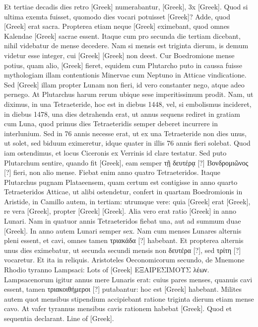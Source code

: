 Et tertiae decadis dies retro \textgreek{[Greek]}
 numerabantur, \textgreek{[Greek]},
\textgreek{3x [Greek]}.
Quod si ultima exemta fuisset,
quomodo  dies vocari potuisset \textgreek{[Greek]}?
Adde, quod
\textgreek{[Greek]} erat sacra.
Propterea etiam neque \textgreek{[Greek]} eximebant,
quod omnes Kalendae \textgreek{[Greek]} sacrae essent.
Itaque cum pro secunda
die tertiam dicebant, nihil videbatur de mense decedere.
Nam si
mensis est triginta dierum, is demum videtur esse integer,
 cui \textgreek{[Greek]}
\textgreek{[Greek]} non deest.
Cur Boedromione mense potius, quam alio,
\textgreek{[Greek]} fieret, equidem cum Plutarcho puto in caussa
 fuisse mythologiam
illam contentionis Minervae cum Neptuno in Atticae vindicatione.
Sed \textgreek{[Greek]} illam propter Lunam non fieri,
 id vero constanter
nego, atque adeo pernego.
At Plutarchus harum rerum ubique sese imperitissimum
prodit.
Nam, ut diximus, in una Tetraeteride, hoc est in
diebus 1448, vel, si embolismus incideret, in diebus 1478, una dies detrahenda
erat, ut annus sequens rediret in gratiam cum Luna, quod
primus dies Tetraeteridis semper deberet incurrere in interlunium.
Sed
in 76 annis necesse erat, ut ex una Tetraeteride non dies unus, ut solet,
sed biduum eximeretur, idque quater in illis 76 annis fieri solebat.
Quod
iam ostendimus, et locus Ciceronis ex Verrinis id clare testatur.
Sed
puto Plutarchum sentire, quando fit \textgreek{[Greek]},
 eam semper \textgreek{τῇ δευτέρᾳ [?]}
\textgreek{Βονδρομιῶνος [?]} fieri, non alio mense.
Fiebat enim anno quatro Tetraeteridos.
Itaque Plutarchus pugnam Plataeensem, quam certum est contigisse
in anno quarto Tetraeteridos Atticae, ut alibi ostendetur, confert
in quartam Boedromionis in Aristide, in Camillo autem, in tertiam:
utrumque vere: quia \textgreek{[Greek]} erat \textgreek{[Greek]},
 re vera \textgreek{[Greek]}, propter \textgreek{[Greek]}
\textgreek{[Greek]}.
Alia vero erat ratio \textgreek{[Greek]} in anno Lunari.
Nam in
quatuor annis Tetraeteridos fiebat una, aut ad summum duae \textgreek{[Greek]}.
In anno autem Lunari semper sex.
Nam cum menses Lunares alternis
pleni essent, et cavi, omnes tamen \textgreek{τριακάδα [?]} habebant.
Et propterea
alternis unus dies eximebatur, ut secunda secundi mensis non
 \textgreek{δευτέρα [?]},
sed \textgreek{τρίτη [?]} vocaretur.
Et ita in reliquis.
Aristoteles Oeconomicorum secundo,
de Mnemone Rhodio tyranno Lampsaci:
 \textgreek{Lots of [Greek] ΕΞΑΙΡΕΣΙΜΟΥΣ λέων}.
Lampsacenorum igitur annus
mere Lunaris erat: cuius pares menses, quanuis cavi essent, tamen
\textgreek{τριακοιθήμεροι [?]} putabantur: hoc est \textgreek{[Greek]}
 habebant.
Milites autem
quot mensibus stipendium accipiebant ratione triginta dierum etiam
mense cavo.
At vafer tyrannus mensibus cavis rationem habebat \textgreek{[Greek]}.
Quod et sequentia declarant.
\textgreek{Line of [Greek]}.

